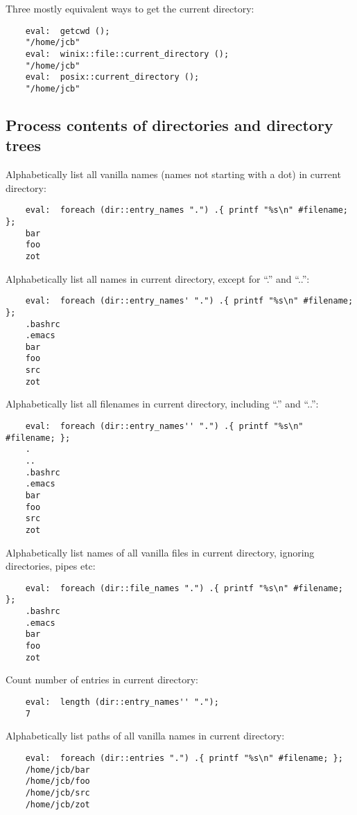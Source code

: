Three mostly equivalent ways to get the current directory:
\begin{verbatim}
    eval:  getcwd ();
    "/home/jcb"
    eval:  winix::file::current_directory ();
    "/home/jcb"
    eval:  posix::current_directory ();
    "/home/jcb"
\end{verbatim}

\cutend*

\subsection{Process contents of directories and directory trees}

Alphabetically list all vanilla names 
(names not starting with a dot) in 
current directory:
\begin{verbatim}
    eval:  foreach (dir::entry_names ".") .{ printf "%s\n" #filename; };
    bar
    foo
    zot
\end{verbatim}

Alphabetically list all names in current directory, except for ``.'' and ``..'':
\begin{verbatim}
    eval:  foreach (dir::entry_names' ".") .{ printf "%s\n" #filename; };
    .bashrc
    .emacs
    bar
    foo
    src
    zot
\end{verbatim}

Alphabetically list all filenames in current directory, including ``.'' and ``..'':
\begin{verbatim}
    eval:  foreach (dir::entry_names'' ".") .{ printf "%s\n" #filename; };
    .
    ..
    .bashrc
    .emacs
    bar
    foo
    src
    zot
\end{verbatim}

Alphabetically list names of all vanilla files in current directory, 
ignoring directories, pipes etc:
\begin{verbatim}
    eval:  foreach (dir::file_names ".") .{ printf "%s\n" #filename; };
    .bashrc
    .emacs
    bar
    foo
    zot
\end{verbatim}

Count number of entries in current directory:
\begin{verbatim}
    eval:  length (dir::entry_names'' ".");
    7
\end{verbatim}

Alphabetically list paths of all vanilla names in current directory:
\begin{verbatim}
    eval:  foreach (dir::entries ".") .{ printf "%s\n" #filename; };
    /home/jcb/bar
    /home/jcb/foo
    /home/jcb/src
    /home/jcb/zot
\end{verbatim}

